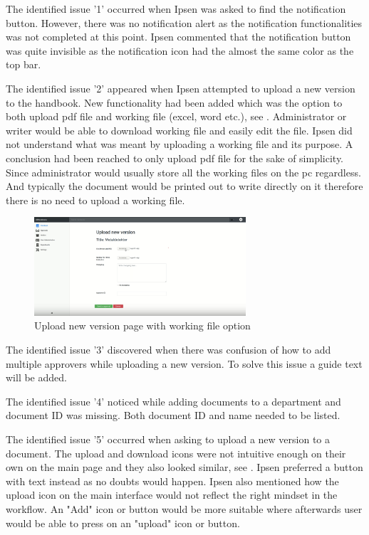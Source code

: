The identified issue '1' occurred when Ipsen was asked to find the notification button. However, there was no notification alert as the notification functionalities was not completed at this point.
Ipsen commented that the notification button was quite invisible as the notification icon had the almost the same color as the top bar.

The identified issue '2' appeared when Ipsen attempted to upload a new version to the handbook.
New functionality had been added which was the option to both upload pdf file and working file (excel, word etc.), see .
Administrator or writer would be able to download working file and easily edit the file.
Ipsen did not understand what was meant by uploading a working file and its purpose.
A conclusion had been reached to only upload pdf file for the sake of simplicity.
Since administrator would usually store all the working files on the pc regardless.
And typically the document would be printed out to write directly on it therefore there is no need to upload a working file.

\begin{figure}[H]
	\centering
		\includegraphics[width=0.7\textwidth]{billeder/WorkingFile.png}
	\caption{Upload new version page with working file option}\label{fig:WorkingFile}
\end{figure}

The identified issue '3' discovered when there was confusion of how to add multiple approvers while uploading a new version.
To solve this issue a guide text will be added.

The identified issue '4' noticed while adding documents to a department and document ID was missing.
Both document ID and name needed to be listed.

The identified issue '5' occurred when asking to upload a new version to a document.
The upload and download icons were not intuitive enough on their own on the main page and they also looked similar, see .
Ipsen preferred a button with text instead as no doubts would happen.
Ipsen also mentioned how the upload icon on the main interface would not reflect the right mindset in the workflow.
An "Add" icon or button would be more suitable where afterwards user would be able to press on an "upload" icon or button.


